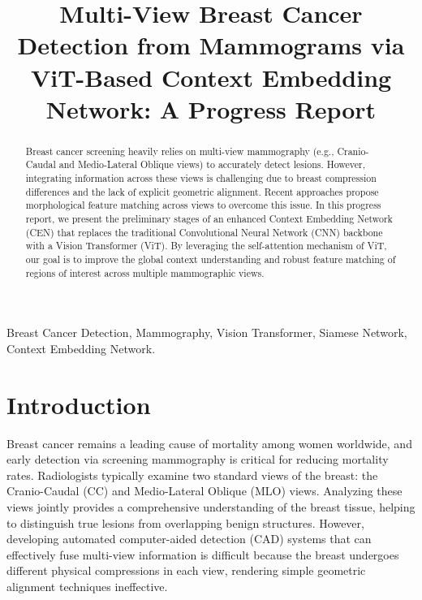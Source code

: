\documentclass[conference]{IEEEtran}
\begin{document}
\title{Multi-View Breast Cancer Detection from Mammograms via ViT-Based Context Embedding Network: A Progress Report}

\author{
}

\maketitle

\begin{abstract}
Breast cancer screening heavily relies on multi-view mammography (e.g., Cranio-Caudal and Medio-Lateral Oblique views) to accurately detect lesions. However, integrating information across these views is challenging due to breast compression differences and the lack of explicit geometric alignment. Recent approaches propose morphological feature matching across views to overcome this issue. In this progress report, we present the preliminary stages of an enhanced Context Embedding Network (CEN) that replaces the traditional Convolutional Neural Network (CNN) backbone with a Vision Transformer (ViT). By leveraging the self-attention mechanism of ViT, our goal is to improve the global context understanding and robust feature matching of regions of interest across multiple mammographic views.
\end{abstract}

\begin{IEEEkeywords}
Breast Cancer Detection, Mammography, Vision Transformer, Siamese Network, Context Embedding Network.
\end{IEEEkeywords}

\section{Introduction}
Breast cancer remains a leading cause of mortality among women worldwide, and early detection via screening mammography is critical for reducing mortality rates. Radiologists typically examine two standard views of the breast: the Cranio-Caudal (CC) and Medio-Lateral Oblique (MLO) views. Analyzing these views jointly provides a comprehensive understanding of the breast tissue, helping to distinguish true lesions from overlapping benign structures. However, developing automated computer-aided detection (CAD) systems that can effectively fuse multi-view information is difficult because the breast undergoes different physical compressions in each view, rendering simple geometric alignment techniques ineffective. 
\end{document}
